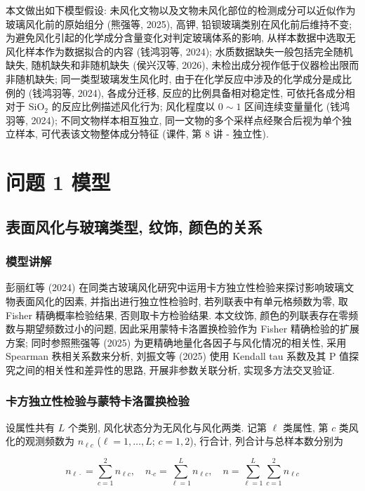 \documentclass{ctexart}
\begin{document}
本文做出如下模型假设: 未风化文物以及文物未风化部位的检测成分可以近似作为玻璃风化前的原始组分 (熊强等, 2025), 高钾, 铅钡玻璃类别在风化前后维持不变; 为避免风化引起的化学成分含量变化对判定玻璃体系的影响, 从样本数据中选取无风化样本作为数据拟合的内容 (钱鸿羽等, 2024); 水质数据缺失一般包括完全随机缺失, 随机缺失和非随机缺失 (侯兴汉等, 2026), 未检出成分视作低于仪器检出限而非随机缺失; 同一类型玻璃发生风化时, 由于在化学反应中涉及的化学成分是成比例的 (钱鸿羽等, 2024), 各成分迁移, 反应的比例具备相对稳定性, 可依托各成分相对于 $\mathrm{SiO_2}$ 的反应比例描述风化行为; 风化程度以 $0\sim1$ 区间连续变量量化 (钱鸿羽等, 2024); 不同文物样本相互独立, 同一文物的多个采样点经聚合后视为单个独立样本, 可代表该文物整体成分特征 (课件, 第 8 讲 - 独立性).

\section{问题 1 模型}

\subsection{表面风化与玻璃类型, 纹饰, 颜色的关系}

\subsubsection{模型讲解}

彭丽红等 (2024) 在同类古玻璃风化研究中运用卡方独立性检验来探讨影响玻璃文物表面风化的因素, 并指出进行独立性检验时, 若列联表中有单元格频数为零, 取 Fisher 精确概率检验结果, 否则取卡方检验结果. 本文纹饰, 颜色的列联表存在零频数与期望频数过小的问题, 因此采用蒙特卡洛置换检验作为 Fisher 精确检验的扩展方案; 同时参照熊强等 (2025) \cite{xiongqiang2025}为更精确地量化各因子与风化情况的相关性, 采用 Spearman 秩相关系数来分析, 刘振文等 (2025) \cite{liuzhenwen2025}使用 Kendall tau 系数及其 P 值探究之间的相关性和差异性的思路, 开展非参数关联分析, 实现多方法交叉验证.


\subsubsection{卡方独立性检验与蒙特卡洛置换检验}

设属性共有 $L$ 个类别, 风化状态分为无风化与风化两类. 记第 $\ell$ 类属性, 第 $c$ 类风化的观测频数为 $n_{\ell{}c}$ ($\ell=1,\dots,L$; $c=1,2$), 行合计, 列合计与总样本数分别为

\begin{equation*}
n_{\ell\cdot}=\sum_{c=1}^{2}n_{\ell{}c},\quad{}n_{\cdot{}c}=\sum_{\ell=1}^{L}n_{\ell{}c},\quad{}n=\sum_{\ell=1}^{L}\sum_{c=1}^{2}n_{\ell{}c}
\end{equation*}
\end{document}
